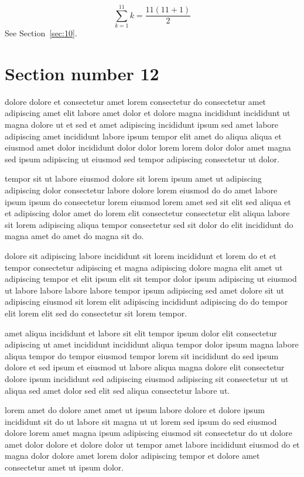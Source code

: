 \documentclass{article}
\begin{document}
\begin{equation} \sum_{k=1}^{11} k = \frac{11(11+1)}{2} \end{equation}
See Section~\ref{sec:10}.

\section{Section number 12}\label{sec:12}
dolore dolore et consectetur amet lorem consectetur do consectetur amet adipiscing amet elit labore amet dolor et dolore magna incididunt incididunt ut magna dolore ut et sed et amet adipiscing incididunt ipsum sed amet labore adipiscing amet incididunt labore ipsum tempor elit amet do aliqua aliqua et eiusmod amet dolor incididunt dolor dolor lorem lorem dolor dolor amet magna sed ipsum adipiscing ut eiusmod sed tempor adipiscing consectetur ut dolor.

tempor sit ut labore eiusmod dolore sit lorem ipsum amet ut adipiscing adipiscing dolor consectetur labore dolore lorem eiusmod do do amet labore ipsum ipsum do consectetur lorem eiusmod lorem amet sed sit elit sed aliqua et et adipiscing dolor amet do lorem elit consectetur consectetur elit aliqua labore sit lorem adipiscing aliqua tempor consectetur sed sit dolor do elit incididunt do magna amet do amet do magna sit do.

dolore sit adipiscing labore incididunt sit lorem incididunt et lorem do et et tempor consectetur adipiscing et magna adipiscing dolore magna elit amet ut adipiscing tempor et elit ipsum elit sit tempor dolor ipsum adipiscing ut eiusmod ut labore labore labore labore tempor ipsum adipiscing sed amet dolore sit ut adipiscing eiusmod sit lorem elit adipiscing incididunt adipiscing do do tempor elit lorem elit sed do consectetur sit lorem tempor.

amet aliqua incididunt et labore sit elit tempor ipsum dolor elit consectetur adipiscing ut amet incididunt incididunt aliqua tempor dolor ipsum magna labore aliqua tempor do tempor eiusmod tempor lorem sit incididunt do sed ipsum dolore et sed ipsum et eiusmod ut labore aliqua magna dolore elit consectetur dolore ipsum incididunt sed adipiscing eiusmod adipiscing sit consectetur ut ut aliqua sed amet dolor sed elit sed aliqua consectetur labore ut.

lorem amet do dolore amet amet ut ipsum labore dolore et dolore ipsum incididunt sit do ut labore sit magna ut ut lorem sed ipsum do sed eiusmod dolore lorem amet magna ipsum adipiscing eiusmod sit consectetur do ut dolore amet dolor dolore et dolore dolor ut tempor amet labore incididunt eiusmod do et magna dolor dolore amet lorem dolor adipiscing tempor et dolore amet consectetur amet ut ipsum dolor.
\end{document}
